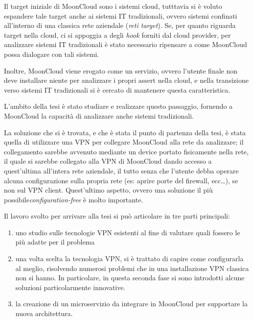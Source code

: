 \documentclass[10pt,a4paper]{article}
\begin{document}
        Il target iniziale di MoonCloud sono i sistemi cloud, tutttavia si è voluto espandere
        tale target anche ai sistemi IT tradizionali, ovvero sistemi
        confinati all'interno di una classica rete aziendale (\textit{reti target}).
        Se, per quanto riguarda target nella
        cloud, ci si appoggia a degli \textit{hook} forniti dal cloud provider, per analizzare
        sistemi IT tradizionali è stato necessario ripensare a come MoonCloud possa dialogare
        con tali sistemi.

        Inoltre, MoonCloud viene erogato come un servizio, ovvero l'utente finale
        non deve installare niente per analizzare i propri assert nella cloud, e nella transizione
        verso sistemi IT tradizionali si è cercato di mantenere questa caratteristica.
        
        L'ambito della tesi è stato studiare e realizzare questo passaggio, fornendo
        a MoonCloud la capacità di analizzare anche sistemi tradizionali.


        La soluzione che si è trovata, e che è stata il punto di partenza della tesi,
        è stata quella di utilizzare una VPN per collegare MoonCloud alla rete
        da analizzare; il collegamento sarebbe avvenuto mediante un device portato
        fisicamente nella rete, il quale si sarebbe collegato alla VPN di MoonCloud dando
        accesso a quest'ultima all'intera rete aziendale, il tutto senza che
        l'utente debba operare alcuna configurazione sulla propria rete (es: aprire porte
        del firewall, ecc\ldots), se non sul VPN client. Quest'ultimo aspetto, ovvero
        una soluzione il più possibile\textit{configuration-free} è molto importante.

        Il lavoro svolto per arrivare alla tesi si può articolare in tre parti principali:
        \begin{enumerate}
            \item uno studio sulle tecnologie VPN esistenti al fine di valutare quali
            fossero le più adatte per il problema
            \item una volta scelta la tecnologia VPN, si è trattato di capire come
            configurarla al meglio, risolvendo numerosi problemi che in una
            installazione VPN classica non si hanno. In particolare, in questa seconda
            fase si sono introdotti alcune soluzioni particolarmente innovative.
            \item la creazione di un microservizio da integrare in MoonCloud per
            supportare la nuova architettura.
        \end{enumerate}
\end{document}
